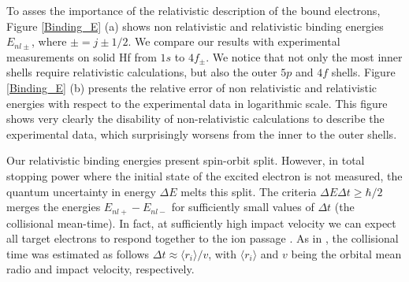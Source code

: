 \documentclass[aps,prb,reprint,groupedaddress]{revtex4-1}
\begin{document}
To asses the importance of the relativistic description of the bound electrons, Figure \ref{Binding_E} (a) shows non relativistic and relativistic binding energies $E_{nl\pm}$, where $\pm=j\pm1/2$.
We compare our results with experimental measurements on solid Hf \cite{williams1995} from $1s$ to $4f_{\pm}$. We notice that not only the most inner shells require relativistic calculations, but also the outer $5p$ and $4f$ shells. Figure \ref{Binding_E} (b) presents the relative error of non relativistic and relativistic energies with respect to the experimental data in logarithmic scale. This figure shows very clearly the disability of non-relativistic calculations to describe the experimental data, which surprisingly worsens from the inner to the outer shells. 


Our relativistic binding energies present spin-orbit split. However, in total stopping power where the initial state of the excited electron is not measured, the quantum uncertainty in energy $\Delta E$ melts this split. The criteria $\Delta E\Delta t \geq \hbar /2$ merges the energies  $E_{nl+} - E_{nl-}$ for sufficiently small values of $\Delta t$ (the collisional mean-time). In fact, at sufficiently high impact velocity we can expect all target electrons to respond together to the ion passage \cite{lindhard53,chu72}. As in \cite{mon09}, the collisional time was estimated as follows $\Delta t \approx \langle r_i\rangle/v$, with $\langle r_i\rangle$ and $v$ being the orbital mean radio and impact velocity, respectively. 
\end{document}
